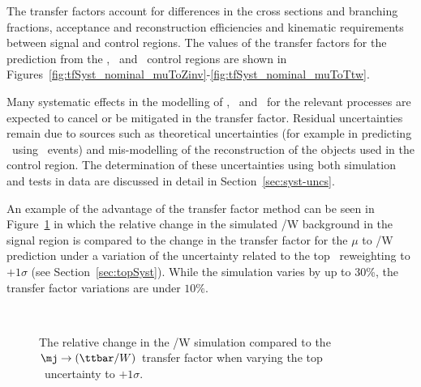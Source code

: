 The transfer factors account for differences in the cross sections and branching fractions,
acceptance and reconstruction efficiencies and kinematic requirements between signal 
and control regions. The values of the transfer factors for the prediction from the \mj,
\mmj~and \gj~control regions are shown in Figures~\ref{fig:tfSyst_nominal_muToZinv}-\ref{fig:tfSyst_nominal_muToTtw}.

Many systematic effects in the modelling of \scalht, \nb~and \njet~for the relevant processes 
are expected to cancel or be mitigated in the transfer factor. Residual uncertainties 
remain due to sources such as theoretical uncertainties (for example
in predicting \znunu~using \gj~events) and mis-modelling of the reconstruction of the objects
used in the control region. The determination of these uncertainties using both simulation 
and tests in data are discussed in detail in Section~\ref{sec:syst-uncs}.

An example of the advantage of the transfer factor method can be seen 
in Figure~\ref{fig:tfSimVar} in which the relative change in the simulated \ttbar/W 
background in the signal region is compared to the change in the transfer factor for 
the $\mu$ to \ttbar/W prediction under a variation of
the uncertainty related to the top \pt~reweighting to $+1\sigma$
(see Section~\ref{sec:topSyst}). While the simulation varies 
by up to 30\%, the transfer factor variations are under $10\%$.

\begin{figure}[!h]
  \centering
   ~~
  \\
  \caption{\label{fig:tfSimVar} The relative change in the
  \ttbar/W simulation compared to the $\mj \rightarrow (\ttbar/W)$ transfer
  factor when varying the top \pt~uncertainty to $+1\sigma$.
  }
\end{figure}

